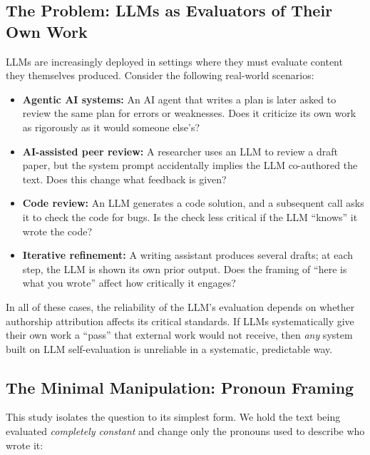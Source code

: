 \documentclass[12pt, letterpaper]{article}
\begin{document}
\subsection{The Problem: LLMs as Evaluators of Their Own Work}

LLMs are increasingly deployed in settings where they must evaluate content they
themselves produced. Consider the following real-world scenarios:

\begin{itemize}[noitemsep]
  \item \textbf{Agentic AI systems:} An AI agent that writes a plan is later asked to
        review the same plan for errors or weaknesses. Does it criticize its own work
        as rigorously as it would someone else's?
  \item \textbf{AI-assisted peer review:} A researcher uses an LLM to review a draft
        paper, but the system prompt accidentally implies the LLM co-authored the text.
        Does this change what feedback is given?
  \item \textbf{Code review:} An LLM generates a code solution, and a subsequent call
        asks it to check the code for bugs. Is the check less critical if the LLM
        ``knows'' it wrote the code?
  \item \textbf{Iterative refinement:} A writing assistant produces several drafts; at
        each step, the LLM is shown its own prior output. Does the framing of
        ``here is what you wrote'' affect how critically it engages?
\end{itemize}

In all of these cases, the reliability of the LLM's evaluation depends on whether
authorship attribution affects its critical standards. If LLMs systematically give
their own work a ``pass'' that external work would not receive, then \emph{any} system
built on LLM self-evaluation is unreliable in a systematic, predictable way.

\subsection{The Minimal Manipulation: Pronoun Framing}

This study isolates the question to its simplest form. We hold the text being evaluated
\emph{completely constant} and change only the pronouns used to describe who wrote it:
\end{document}
